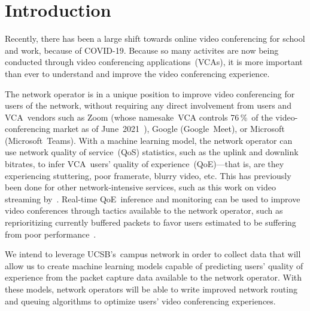 \section{Introduction}\label{introduction}


    Recently, there has been a large shift towards online video conferencing for school and work, because of COVID-19. Because so many activites are now being conducted through video conferencing applications~(VCAs), it is more important than ever to understand and improve the video conferencing experience.

    The network operator is in a unique position to improve video conferencing for users of the network, without requiring any direct involvement from users and VCA~vendors such as Zoom (whose namesake~VCA controls 76\,\%~of the video-conferencing market as of June~2021~\autocite{kim2021}), Google (Google~Meet), or Microsoft (Microsoft~Teams). With a machine learning model, the network operator can use network quality of service~(QoS) statistics, such as the uplink and downlink bitrates, to infer VCA~users' quality of experience~(QoE)---that is, are they experiencing stuttering, poor framerate, blurry video, etc. This has previously been done for other network-intensive services, such as this work on video streaming by~\textcite{ChenYanjiao2015FQtQ}. Real-time QoE~inference and monitoring can be used to improve video conferences through tactics available to the network operator, such as reprioritizing currently buffered packets to favor users estimated to be suffering from poor performance~\autocite{DinakiHosseinEbrahimi2021FVQW}.

    We intend to leverage UCSB's~campus network in order to collect data that will allow us to create machine learning models capable of predicting users' quality of experience from the packet capture data available to the network operator. With these models, network operators will be able to write improved network routing and queuing algorithms to optimize users' video conferencing experiences. %

